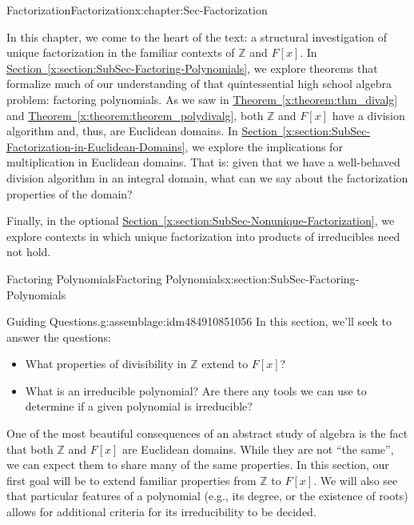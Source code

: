 \documentclass[oneside,10pt,]{book}
\newcommand{\xreffont}{\relax}
\numberwithin{equation}{section}
\def\Z{{\mathbb Z}}
\begin{document}
\begin{chapterptx}{Factorization}{}{Factorization}{}{}{x:chapter:Sec-Factorization}
\begin{introduction}{}%
In this chapter, we come to the heart of the text: a structural investigation of unique factorization in the familiar contexts of \(\Z\) and \(F[x]\). In \hyperref[x:section:SubSec-Factoring-Polynomials]{Section~{\xreffont\ref{x:section:SubSec-Factoring-Polynomials}}}, we explore theorems that formalize much of our understanding of that quintessential high school algebra problem: factoring polynomials. As we saw in \hyperref[x:theorem:thm_divalg]{Theorem~{\xreffont\ref{x:theorem:thm_divalg}}} and \hyperref[x:theorem:theorem_polydivalg]{Theorem~{\xreffont\ref{x:theorem:theorem_polydivalg}}}, both \(\Z\) and \(F[x]\) have a division algorithm and, thus, are Euclidean domains. In \hyperref[x:section:SubSec-Factorization-in-Euclidean-Domains]{Section~{\xreffont\ref{x:section:SubSec-Factorization-in-Euclidean-Domains}}}, we explore the implications for multiplication in Euclidean domains. That is: given that we have a well-behaved division algorithm in an integral domain, what can we say about the factorization properties of the domain?%
\par
Finally, in the optional \hyperref[x:section:SubSec-Nonunique-Factorization]{Section~{\xreffont\ref{x:section:SubSec-Nonunique-Factorization}}}, we explore contexts in which unique factorization into products of irreducibles need not hold.%
\end{introduction}%
%
%
\typeout{************************************************}
\typeout{************************************************}
%
\begin{sectionptx}{Factoring Polynomials}{}{Factoring Polynomials}{}{}{x:section:SubSec-Factoring-Polynomials}
\begin{assemblage}{Guiding Questions.}{g:assemblage:idm484910851056}%
In this section, we'll seek to answer the questions: %
\begin{itemize}[label=\textbullet]
\item{}What properties of divisibility in \(\Z\) extend to \(F[x]\)?%
\item{}What is an irreducible polynomial? Are there any tools we can use to determine if a given polynomial is irreducible?%
\end{itemize}
%
\end{assemblage}
One of the most beautiful consequences of an abstract study of algebra is the fact that both \(\Z\) and \(F[x]\) are Euclidean domains. While they are not ``the same'', we can expect them to share many of the same properties. In this section, our first goal will be to extend familiar properties from \(\Z\) to \(F[x]\). We will also see that particular features of a polynomial (e.g., its degree, or the existence of roots) allows for additional criteria for its irreducibility to be decided.%

\end{sectionptx}
\end{chapterptx}
\end{document}
